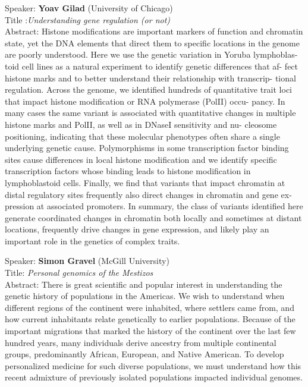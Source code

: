 \documentclass[11pt]{article}
\begin{document}
\bigskip
\noindent
Speaker: {\bf Yoav Gilad} (University of Chicago)\\
Title :{\it Understanding gene regulation (or not)}\\
Abstract: Histone modifications are important markers of function and
chromatin state, yet the DNA elements that direct them to specific
locations in the genome are poorly understood. Here we use the genetic
variation in Yoruba lymphoblas- toid cell lines as a natural
experiment to identify genetic differences that af- fect histone marks
and to better understand their relationship with transcrip- tional
regulation. Across the genome, we identified hundreds of quantitative
trait loci that impact histone modification or RNA polymerase (PolII)
occu- pancy. In many cases the same variant is associated with
quantitative changes in multiple histone marks and PolII, as well as
in DNaseI sensitivity and nu- cleosome positioning, indicating that
these molecular phenotypes often share a single underlying genetic
cause. Polymorphisms in some transcription factor binding sites cause
differences in local histone modification and we identify specific
transcription factors whose binding leads to histone modification in
lymphoblastoid cells. Finally, we find that variants that impact
chromatin at distal regulatory sites frequently also direct changes in
chromatin and gene ex- pression at associated promoters. In summary,
the class of variants identified here generate coordinated changes in
chromatin both locally and sometimes at distant locations, frequently
drive changes in gene expression, and likely play an important role in
the genetics of complex traits.

\bigskip
\noindent
Speaker: {\bf Simon Gravel} (McGill University)\\
Title: {\it Personal genomics of the Mestizos}\\
Abstract: There is great scientific and popular interest in
understanding the genetic history of populations in the Americas.  We
wish to understand when different regions of the continent were
inhabited, where settlers came from, and how current inhabitants
relate genetically to earlier populations. Because of the important
migrations that marked the history of the continent over the last few
hundred years, many individuals derive ancestry from multiple
continental groups, predominantly African, European, and Native
American. To develop personalized medicine for such diverse
populations, we must understand how this recent admixture of
previously isolated populations impacted individual genomes.\\
\end{document}
